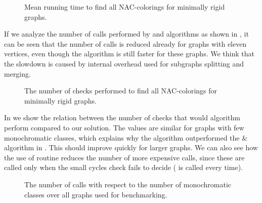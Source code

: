 \begin{figure}[ht]
	\centering
	\scalebox{\BenchFigureScale}{}
	\caption[Running time for minimally rigid graphs]{
		Mean running time to find all NAC-colorings for minimally rigid graphs.}%
	\label{fig:graph_time_minimally_rigid}
\end{figure}%

If we analyze the number of \IsNACColoring{} calls performed by \NaiveCycles{} and \Subgraphs{} algorithms
as shown in ,
it can be seen that the number of \IsNACColoring{} calls is reduced already for graphs
with eleven vertices,
even though the \NaiveCycles{} algorithm is still faster for these graphs.
%
We think that the slowdown is caused by internal overhead
used for subgraphs splitting and merging.

\begin{figure}[ht]
	\centering
	\scalebox{\BenchFigureScale}{}
	\caption[Checks performed for minimally rigid graphs]{
		The number of checks performed to find all NAC-colorings for minimally rigid graphs.}%
	\label{fig:graph_count_minimally_rigid}
\end{figure}%

In 
we show the relation between the number of \IsNACColoring{} checks that
would \Naive{} algorithm perform compared to our solution.
%
The values are similar for graphs with few monochromatic classes,
which explains why the \NaiveCycles{} algorithm outperformed
the \NeighborsDegree{}\&\MergeLinear{} algorithm in . This should improve quickly for larger graphs.
We can also see how the use of \CycleMask{} routine
reduces the number of more expensive \IsNACColoring{} calls,
since these are called only when the small cycles check \CycleMask{} fails to decide
(\CycleMask{} is called every time).

\begin{figure}[ht]
	\centering
	\scalebox{\BenchFigureScale}{}
	\caption[The number of \IsNACColoring{} calls]{
		The number of \IsNACColoring{} calls with respect to the number of monochromatic classes
		over all graphs used for benchmarking.}%
	\label{fig:graph_summary}
\end{figure}%



